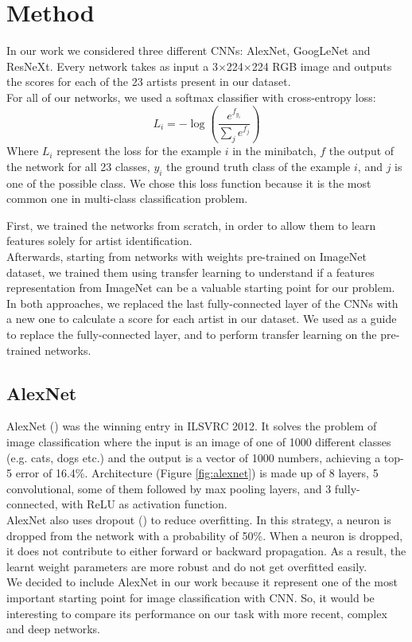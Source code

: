 \documentclass{article}
\begin{document}
\section{Method}\label{method}
In our work we considered three different CNNs: AlexNet, GoogLeNet and ResNeXt. Every network takes as input a 3$\times$224$\times$224 RGB image and outputs the scores for each of the 23 artists present in our dataset.\\
For all of our networks, we used a softmax classifier with cross-entropy loss:
\begin{equation}
L_{i}=-\log \left(\frac{e^{f_{y_{i}}}}{\sum_{j} e^{f_{j}}}\right)
\end{equation}
Where $L_{i}$ represent the loss for the example $i$ in the minibatch, $f$ the output of the network for all 23 classes, $y_{i}$ the ground truth class of the example $i$, and $j$ is one of the possible class. 
We chose this loss function because it is the most common one in multi-class classification problem.

First, we trained the networks from scratch, in order to allow them to learn features solely for artist identification. \\
Afterwards, starting from networks with weights pre-trained on ImageNet dataset, we trained them using transfer learning to understand if a features representation from ImageNet can be a valuable starting point for our problem.\\
In both approaches, we replaced the last fully-connected layer of the CNNs with a new one to calculate a score for each artist in
our dataset. We used \cite{pytorchguide} as a guide to replace the fully-connected layer, and to perform transfer learning on the pre-trained networks.

\subsection{AlexNet}
AlexNet (\cite{alexnet}) was the winning entry in ILSVRC 2012. It solves the problem of image classification where the input is an image of one of 1000 different classes (e.g. cats, dogs etc.) and the output is a vector of 1000 numbers, achieving a top-5 error of 16.4\%.
Architecture (Figure \ref{fig:alexnet}) is made up of 8 layers, 5 convolutional, some of them followed by max pooling layers, and 3 fully-connected, with ReLU as activation function.\\
AlexNet also uses dropout (\cite{dropout}) to reduce overfitting. In this strategy, a neuron is dropped from the network with a probability of 50\%. When a neuron is dropped, it does not contribute to either forward or backward propagation. 
As a result, the learnt weight parameters are more robust and do not get overfitted easily.\\
We decided to include AlexNet in our work because it represent one of the most important starting point for image classification with CNN. So, it would be interesting to compare its performance on our task with more recent, complex and deep networks.
\end{document}
